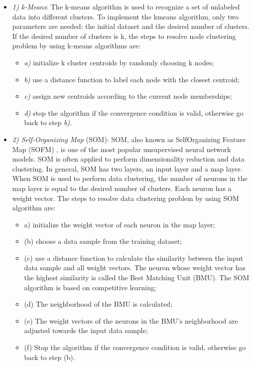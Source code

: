 \begin{itemize}
\begin{itemize}
\item[]\textit{1)	k-Means}: The k-means algorithm is used to recognize a set of unlabeled data into different clusters. To implement the kmeans algorithm, only two parameters are needed: the initial dataset and the desired number of clusters. If the desired number of clusters is k, the steps to resolve node clustering problem by using k-means algorithms are:
\begin{itemize}
\item[]\textit{a)} initialize k cluster centroids by randomly choosing k nodes;
\item[]\textit{b)} use a distance function to label each node with the closest centroid;
\item[]\textit{c)} assign new centroids according to the current node memberships;
\item[]\textit{d)} stop the algorithm if the convergence condition is valid, otherwise go back to step \textit{b)}.
\end{itemize}
\item[]\textit{2)	Self-Organizing Map} (SOM): SOM, also known as SelfOrganizing Feature Map (SOFM) \cite{Kohonen2012}, is one of the most popular unsupervised neural network models. SOM is often applied to perform dimensionality reduction and data clustering. In general, SOM has two layers, an input layer and a map layer. When SOM is used to perform data clustering, the number of neurons in the map layer is equal to the desired number of clusters. Each neuron has a weight vector. The steps to resolve data clustering problem by using SOM algorithm are:
\begin{itemize}
\item[]a) initialize the weight vector of each neuron in the map layer;
\item[](b) choose a data sample from the training dataset;
\item[](c) use a distance function to calculate the similarity between the input data sample and all weight vectors. The neuron whose weight vector has the highest similarity is called the Best Matching Unit (BMU). The SOM algorithm is based on competitive learning;
\item[](d) The neighborhood of the BMU is calculated;
\item[](e) The weight vectors of the neurons in the BMU’s neighborhood are adjusted towards the input data sample;
\item[](f) Stop the algorithm if the convergence condition is valid, otherwise go back to step (b).

\end{itemize}
\end{itemize}
\end{itemize}

